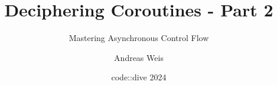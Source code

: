 \documentclass[aspectratio=169]{beamer}
\title{Deciphering Coroutines - Part 2}
\subtitle{Mastering Asynchronous Control Flow}
\author{Andreas Weis}
\date{code::dive 2024}
\begin{document}

\frame{\titlepage}

\iftrue %
\fi

\end{document}
